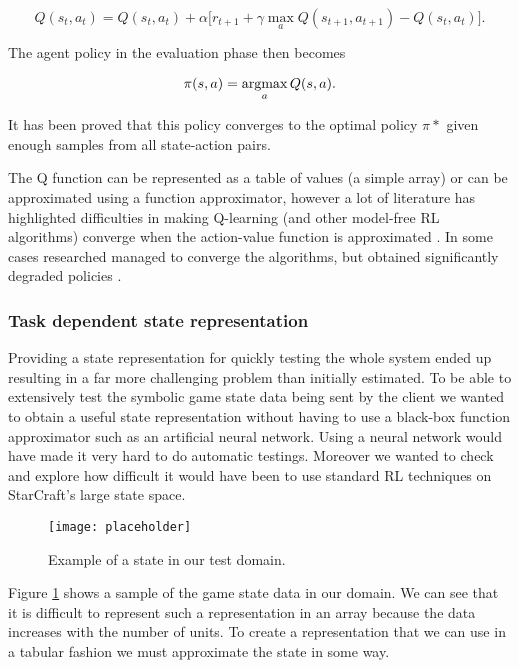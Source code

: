 \begin{equation}
  Q(s_t, a_t) = Q(s_t, a_t) + 
  \alpha \bigg[ r_{t+1} + \gamma \max_a Q(s_{t+1}, a_{t+1}) - Q(s_t, a_t) \bigg].
\label{eq:ql}
\end{equation}

The agent policy in the evaluation phase then becomes

\begin{equation}
  \pi(s, a) = \operatornamewithlimits{argmax}_a Q(s, a).
\label{eq:ql2}
\end{equation}

It has been proved that this policy converges to the optimal policy $\pi*$ given
enough samples from all state-action pairs. %

The Q function can be represented as a table of values (a simple array) or can
be approximated using a function approximator, however a lot of literature has
highlighted difficulties in making Q-learning (and other model-free RL
algorithms) converge when the action-value function is approximated
\citep{Baird_1997}. In some cases researched managed to converge the algorithms,
but obtained significantly degraded policies \citep{bertsekas_1996_tetris,
  waver_and_baxter_1999, boyan_and_moore_1995}.

\subsubsection{Task dependent state representation}

Providing a state representation for quickly testing the whole system ended up
resulting in a far more challenging problem than initially estimated. To be able
to extensively test the symbolic game state data being sent by the client we
wanted to obtain a useful state representation without having to use a black-box
function approximator such as an artificial neural network. Using a neural
network would have made it very hard to do automatic testings. Moreover we
wanted to check and explore how difficult it would have been to use standard RL
techniques on StarCraft's large state space.

\begin{figure}[h]
    \centering
    \texttt{[image: placeholder]}
    \caption{Example of a state in our test domain.}
    \label{fig:sample_state}
\end{figure}

Figure \ref{fig:sample_state} shows a sample of the game state data in our
domain. We can see that it is difficult to represent such a representation in an
array because the data increases with the number of units. To create a
representation that we can use in a tabular fashion we must approximate the
state in some way.


